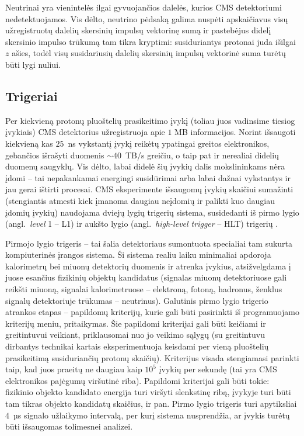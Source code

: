 \documentclass[a4paper, 12pt, oneside]{article}
\begin{document}
Neutrinai yra vienintelės ilgai gyvuojančios dalelės, kurios CMS detektoriumi nedetektuojamos.
Vis dėlto, neutrino pėdsaką galima nuspėti apskaičiavus visų užregistruotų dalelių skersinių impulsų vektorinę sumą
ir pastebėjus didelį skersinio impulso trūkumą tam tikra kryptimi: susiduriantys protonai juda išilgai $z$ ašies,
todėl visų susidariusių dalelių skersinių impulsų vektorinė suma turėtų būti lygi nuliui.

\subsection{Trigeriai}
Per kiekvieną protonų pluoštelių prasikeitimo įvykį (toliau juos vadinsime tiesiog įvykiais) CMS detektorius
užregistruoja apie $1$ MB informacijos.
Norint išsaugoti kiekvieną kas $25$~ns vykstantį įvykį reikėtų ypatingai greitos elektronikos, gebančios išrašyti
duomenis $\sim\!\!40$~TB/s greičiu, o taip pat ir nerealiai didelių duomenų saugyklų.
Vis dėlto, labai didelė šių įvykių dalis mokslininkams nėra įdomi -- tai nepakankamai energingi susidūrimai
arba labai dažnai vykstantys ir jau gerai ištirti procesai.
CMS eksperimente išsaugomų įvykių skaičiui sumažinti (stengiantis atmesti kiek įmanoma daugiau neįdomių ir palikti
kuo daugiau įdomių įvykių) naudojama dviejų lygių trigerių sistema, susidedanti iš pirmo lygio
(angl.\ \textit{level} 1 -- L1) ir aukšto lygio (angl.\ \textit{high-level trigger} -- HLT) trigerių \cite{CMStrig}.

Pirmojo lygio trigeris -- tai šalia detektoriaus sumontuota specialiai tam sukurta kompiuterinės įrangos sistema.
Ši sistema realiu laiku minimaliai apdoroja kalorimetrų bei miuonų detektorių duomenis ir atrenka įvykius, atsižvelgdama
į juose esančius fizikinių objektų kandidatus (signalas miuonų detektoriuose gali reikšti miuoną, signalai kalorimetruose --
elektroną, fotoną, hadronus, ženklus signalų detektoriuje trūkumas -- neutrinus).
Galutinis pirmo lygio trigerio atrankos etapas -- papildomų kriterijų, kurie gali būti pasirinkti iš programuojamo
kriterijų meniu, pritaikymas.
Šie papildomi kriterijai gali būti keičiami ir greitintuvui veikiant, priklausomai nuo jo veikimo sąlygų
(su greitintuvu dirbantys technikai kartais eksperimentuoja keisdami per vieną pluoštelių prasikeitimą susiduriančių protonų skaičių).
Kriterijus visada stengiamasi parinkti taip, kad juos praeitų ne daugiau kaip $10^5$ įvykių per sekundę
(tai yra CMS elektronikos pajėgumų viršutinė riba).
Papildomi kriterijai gali būti tokie: fizikinio objekto kandidato energija turi viršyti slenkstinę ribą, įvykyje turi
būti tam tikras objekto kandidatų skaičius, ir pan.
Pirmo lygio trigeris turi apytiksliai $4$~µs signalo užlaikymo intervalą, per kurį sistema nusprendžia, ar įvykis turėtų būti
išsaugomas tolimesnei analizei. 
\end{document}

